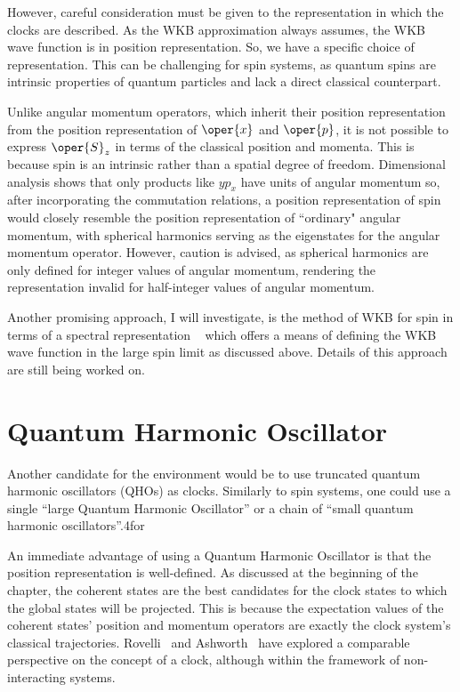 However, careful consideration must be given to the representation in which the clocks are described.
As the WKB approximation always assumes, the WKB wave function is in position representation. So, we have a specific choice of representation. This can be challenging for spin systems, as quantum
spins are intrinsic properties of quantum particles and lack a direct classical counterpart.

Unlike angular momentum operators, which inherit their position representation from the position
representation of $\oper{x}$ and $\oper{p}$​, it is not possible to express $\oper{S}_z$ in terms of the classical position and momenta. 
This is because spin is an intrinsic rather than a spatial degree of freedom. Dimensional analysis shows that only products like
$yp_x$ have units of angular momentum so, after incorporating the commutation relations, 
a position representation of spin would closely resemble the position representation of ``ordinary" angular momentum, 
with spherical harmonics serving as the eigenstates for the angular momentum operator. However, caution is advised,
as spherical harmonics are only defined for integer values of angular momentum, rendering the representation invalid
for half-integer values of angular momentum.

Another promising approach, I will investigate, is the method of WKB for spin in terms of a spectral representation
~\cite{van1986tunneling,van2003wkb} which offers a means of defining the WKB wave function in the large spin limit as discussed above.
Details of this approach are still being worked on.

\section{Quantum Harmonic Oscillator}
Another candidate for the environment would be to use truncated quantum harmonic oscillators (QHOs) as clocks. 
Similarly to spin systems, one could use a single ``large Quantum Harmonic Oscillator'' or
 a chain of ``small quantum harmonic oscillators''.4for

An immediate advantage of using a Quantum Harmonic Oscillator is that the position representation
is well-defined. As discussed at the beginning of the chapter, the coherent states are the best
candidates for the clock states to which the global states will be projected. This is because
the expectation values of the coherent states' position and momentum operators are exactly the clock system's classical trajectories. Rovelli~\cite{rovelli1990quantum} and Ashworth~\cite{Ashworth:1996eq} have explored a comparable perspective on the concept of a clock, although within the framework of non-interacting systems.

